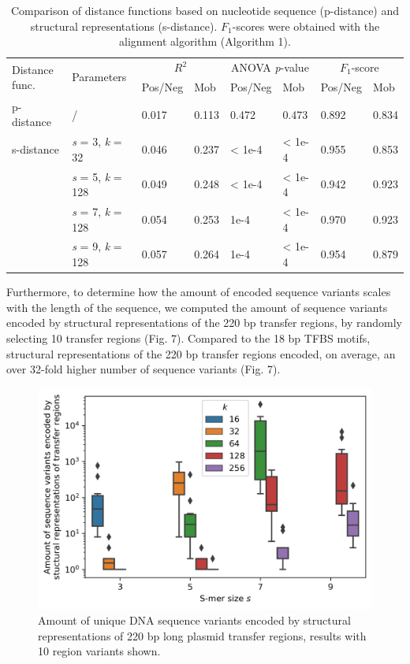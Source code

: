 \documentclass[sigconf]{acmart}
\begin{document}
\begin{table}
  \caption{Comparison of distance functions based on nucleotide sequence (p-distance) and structural representations (s-distance). $F_1$-scores were obtained with the alignment algorithm (Algorithm 1).}
  \begin{tabular}{p{2cm}|p{2cm}|p{1.5cm}|p{1.5cm}|p{1.5cm}|p{1.5cm}|p{1.5cm}|p{1.5cm}}
  \toprule
  \multirow{2}{*}{Distance func.} & 
  \multirow{2}{*}{Parameters} & 
  \multicolumn{2}{c}{\textit{$R^2$}} & 
  \multicolumn{2}{c}{ANOVA \textit{p}-value} & 
  \multicolumn{2}{c}{$F_1$-score} \\
  \cline{3-8} & & Pos/Neg & Mob & Pos/Neg & Mob& Pos/Neg & Mob \\
  \midrule
    p-distance & / & 0.017 & 0.113 & 0.472 & 0.473 & 0.892 & 0.834\\
    s-distance & \textit{s} = 3, \textit{k} = 32 & 0.046 & 0.237 & < 1e-4 & < 1e-4 & 0.955 & 0.853\\
     & \textit{s} = 5, \textit{k} = 128 & 0.049 & 0.248 & < 1e-4 & < 1e-4 & 0.942 & 0.923\\
     & \textit{s} = 7, \textit{k} = 128 & 0.054 & 0.253 & 1e-4 & < 1e-4 & 0.970 & 0.923\\
     & \textit{s} = 9, \textit{k} = 128 & 0.057 & 0.264 & 1e-4 & < 1e-4 & 0.954 & 0.879\\
  \bottomrule
  \end{tabular}
\end{table}

Furthermore, to determine how the amount of encoded sequence variants scales with the length of the sequence, we computed the amount of sequence variants encoded by structural representations of the 220 bp transfer regions, by randomly selecting 10 transfer regions (Fig. 7). Compared to the 18 bp TFBS motifs, structural representations of the 220 bp transfer regions encoded, on average, an over 32-fold higher number of sequence variants (Fig. 7).

\begin{figure}[ht]
  \centering
  \includegraphics[width=\linewidth]{smer_fig_variants_orit.png}
  \caption{Amount of unique DNA sequence variants encoded by structural representations of 220 bp long plasmid transfer regions, results with 10 region variants shown.}
\end{figure}
\end{document}
